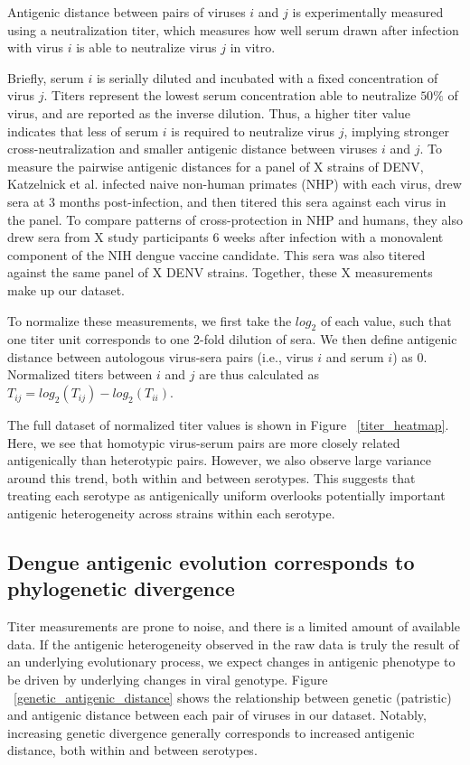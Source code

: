 \documentclass[11pt,oneside,letterpaper]{article}
\begin{document}
Antigenic distance between pairs of viruses $i$ and $j$ is experimentally measured using a neutralization titer, which measures how well serum drawn after infection with virus $i$ is able to neutralize virus $j$ in vitro.

Briefly, serum $i$ is serially diluted and incubated with a fixed concentration of virus $j$.
Titers represent the lowest serum concentration able to neutralize $50\%$ of virus, and are reported as the inverse dilution.
Thus, a higher titer value indicates that less of serum $i$ is required to neutralize virus $j$, implying stronger cross-neutralization and smaller antigenic distance between viruses $i$ and $j$.
To measure the pairwise antigenic distances for a panel of X strains of DENV, Katzelnick et al. infected naive non-human primates (NHP) with each virus, drew sera at 3 months post-infection, and then titered this sera against each virus in the panel.
To compare patterns of cross-protection in NHP and humans, they also drew sera from X study participants 6 weeks after infection with a monovalent component of the NIH dengue vaccine candidate.
This sera was also titered against the same panel of X DENV strains.
Together, these X measurements make up our dataset.

To normalize these measurements, we first take the $log_2$ of each value, such that one titer unit corresponds to one 2-fold dilution of sera.
We then define antigenic distance between autologous virus-sera pairs (i.e., virus $i$ and serum $i$) as 0.
Normalized titers between $i$ and $j$ are thus calculated as $T_{ij} = log_2(T_{ij}) - log_2(T_{ii})$.

The full dataset of normalized titer values is shown in Figure ~\ref{titer_heatmap}.
Here, we see that homotypic virus-serum pairs are more closely related antigenically than heterotypic pairs.
However, we also observe large variance around this trend, both within and between serotypes.
This suggests that treating each serotype as antigenically uniform overlooks potentially important antigenic heterogeneity across strains within each serotype.

\subsection{Dengue antigenic evolution corresponds to phylogenetic divergence}

Titer measurements are prone to noise, and there is a limited amount of available data.
If the antigenic heterogeneity observed in the raw data is truly the result of an underlying evolutionary process, we expect changes in antigenic phenotype to be driven by underlying changes in viral genotype.
Figure ~\ref{genetic_antigenic_distance} shows the relationship between genetic (patristic) and antigenic distance between each pair of viruses in our dataset.
Notably, increasing genetic divergence generally corresponds to increased antigenic distance, both within and between serotypes.
\end{document}

